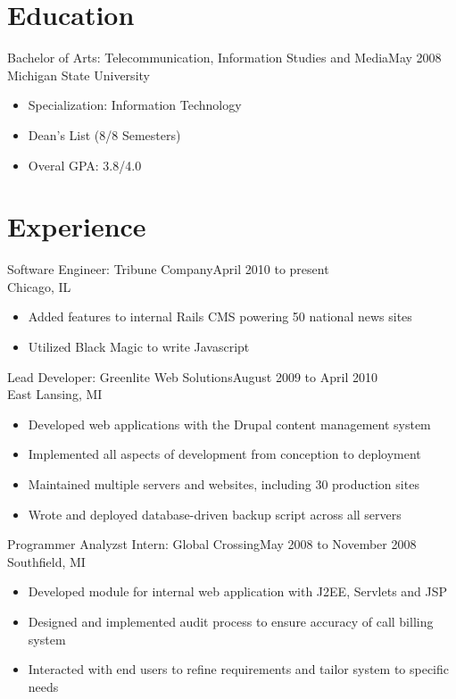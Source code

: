 \documentclass[]{res}
\begin{document}


\begin{resume}
\section{Education}
Bachelor of Arts: Telecommunication, Information Studies and Media\dotfill May 2008\\
Michigan State University
\begin{itemize}
\item Specialization: Information Technology
\item Dean's List (8/8 Semesters)
\item Overal GPA: 3.8/4.0
\end{itemize}


\section{Experience}
Software Engineer: Tribune Company\dotfill April 2010 to present\\
Chicago, IL
\begin{itemize}
\item Added features to internal Rails CMS powering 50 national news sites
\item Utilized Black Magic to write Javascript
\end{itemize}

Lead Developer: Greenlite Web Solutions\dotfill August 2009 to April 2010\\
East Lansing, MI
\begin{itemize}
\item Developed web applications with the Drupal content management system
\item Implemented all aspects of development from conception to deployment
\item Maintained multiple servers and websites, including 30 production sites
\item Wrote and deployed database-driven backup script across all servers
\end{itemize}

Programmer Analyzst Intern: Global Crossing\dotfill May 2008 to November 2008\\
Southfield, MI
\begin{itemize}
\item Developed module for internal web application with J2EE, Servlets and JSP
\item Designed and implemented audit process to ensure accuracy of call billing system
\item Interacted with end users to refine requirements and tailor system to specific needs
\end{itemize}


\end{resume}
\end{document}
